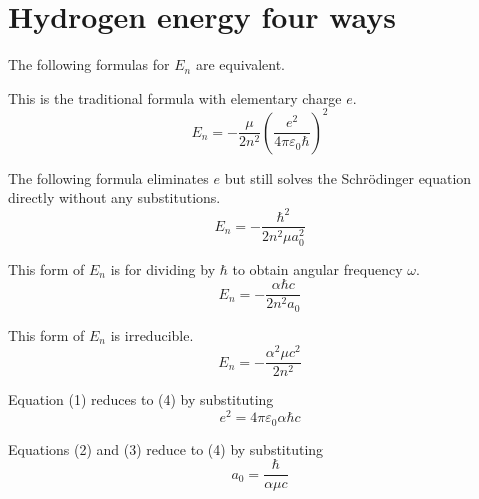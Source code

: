 

\section*{Hydrogen energy four ways}

The following formulas for $E_n$ are equivalent.

\bigskip
This is the traditional formula with elementary charge $e$.
\begin{equation*}
E_n=-\frac{\mu}{2n^2}\left(\frac{e^2}{4\pi\varepsilon_0\hbar}\right)^2
\tag{1}
\end{equation*}

The following formula eliminates $e$ but still solves the
Schr\"odinger equation directly without any substitutions.
\begin{equation*}
E_n=-\frac{\hbar^2}{2n^2\mu a_0^2}
\tag{2}
\end{equation*}

This form of $E_n$ is for dividing by $\hbar$ to obtain angular frequency $\omega$.
\begin{equation*}
E_n=-\frac{\alpha\hbar c}{2n^2a_0}
\tag{3}
\end{equation*}

This form of $E_n$ is irreducible.
\begin{equation*}
E_n=-\frac{\alpha^2\mu c^2}{2n^2}
\tag{4}
\end{equation*}

Equation (1) reduces to (4) by substituting
\begin{equation*}
e^2=4\pi\varepsilon_0\alpha\hbar c
\end{equation*}

Equations (2) and (3) reduce to (4) by substituting
\begin{equation*}
a_0=\frac{\hbar}{\alpha\mu c}
\end{equation*}


